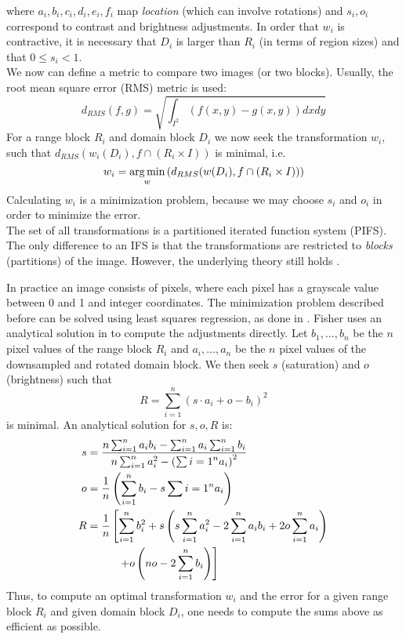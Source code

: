 where $a_i, b_i, c_i, d_i, e_i, f_i$ map \textit{location} (which can involve rotations) and $s_i, o_i$ correspond to contrast and brightness adjustments.
In order that $w_i$ is contractive, it is necessary that $D_i$ is larger than $R_i$ (in terms of region sizes) and that $0 \leq s_i < 1$.
\\
We now can define a metric to compare two images (or two blocks). Usually, the root mean square error (RMS) metric is used:
$$
d_{RMS}(f,g) = \sqrt{\int_{I^2} (f(x,y)-g(x,y))dxdy}
$$
For a range block $R_i$ and domain block $D_i$ we now seek the transformation $w_i$, such that $d_{RMS}(w_i(D_i), f \cap (R_i \times I))$ is minimal, i.e.
$$
    w_i = \operatorname*{arg\,min}_{w} \left( d_{RMS}(w(D_i), f \cap (R_i \times I)) \right)
$$
Calculating $w_i$ is a minimization problem, because we may choose $s_i$ and $o_i$ in order to minimize the error.\\
The set of all transformations is a partitioned iterated function system (PIFS). The only difference to an IFS is that the transformations are restricted
to \textit{blocks} (partitions) of the image. However, the underlying theory still holds \cite{fisher2012}.

 \label{par-practical-implementation}
In practice an image consists of pixels, where each pixel has a grayscale value between 0 and 1 and integer coordinates.
The minimization problem described before can be solved using least squares regression, as done in \cite{github-python}.
Fisher uses an analytical solution in \cite{fisher2012} to compute the adjustments directly. Let $b_1, ..., b_n$ be the $n$ pixel values of the range block $R_i$
and $a_i,...,a_n$ be the $n$ pixel values of the downsampled and rotated domain block. We then seek $s$ (saturation) and $o$ (brightness) such that
$$
R = \sum_{i=1}^n (s \cdot a_i + o - b_i)^2
$$
is minimal. An analytical solution for $s,o,R$ is:
\begin{align*}
    s &= \frac{n \sum_{i=1}^n a_i b_i - \sum_{i=1}^n a_i \sum_{i=1}^n b_i}{n \sum_{i=1}^n a_i^2 - \left(\sum{i=1}^n a_i \right)^2} \\
    o &= \frac{1}{n} \left( \sum_{i=1}^n b_i - s \sum_{}{i=1}^n a_i \right) \\
    R &= \frac{1}{n} \left[ \sum_{i=1}^n b_i^2 + s \left( s \sum_{i=1}^n a_i^2 - 2 \sum_{i=1}^n a_i b_i + 2o \sum_{i=1}^n a_i \right) \right. \\
    &\text{\hspace{1cm}} \left. + o \left(no - 2 \sum_{i=1}^n b_i \right)  \right]
    \end{align*}
Thus, to compute an optimal transformation $w_i$ and the error for a given range block $R_i$ and given domain block $D_i$, one needs to compute the sums above
as efficient as possible.

